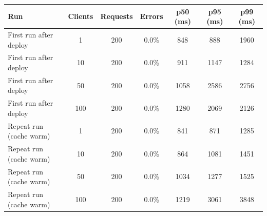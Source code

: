 \begin{tabular}{lcccccc}
\hline
Run & Clients & Requests & Errors & p50 (ms) & p95 (ms) & p99 (ms) \\
\hline
First run after deploy & 1 & 200 & 0.0\% & 848 & 888 & 1960 \\
First run after deploy & 10 & 200 & 0.0\% & 911 & 1147 & 1284 \\
First run after deploy & 50 & 200 & 0.0\% & 1058 & 2586 & 2756 \\
First run after deploy & 100 & 200 & 0.0\% & 1280 & 2069 & 2126 \\
Repeat run (cache warm) & 1 & 200 & 0.0\% & 841 & 871 & 1285 \\
Repeat run (cache warm) & 10 & 200 & 0.0\% & 864 & 1081 & 1451 \\
Repeat run (cache warm) & 50 & 200 & 0.0\% & 1034 & 1277 & 1525 \\
Repeat run (cache warm) & 100 & 200 & 0.0\% & 1219 & 3061 & 3848 \\
\hline
\end{tabular}
